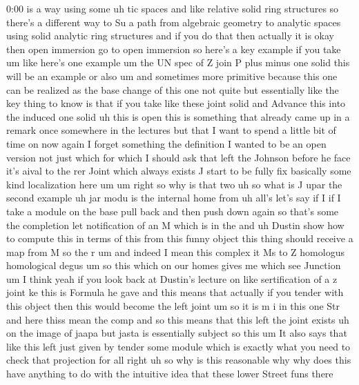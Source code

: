 \begin{unfinished}{0:00}
is  a  way  using  some  uh  tic
spaces  and  like  relative  solid  ring
structures  so  there's  a  different  way  to
Su  a  path  from  algebraic  geometry  to
analytic  spaces  using  solid  analytic
ring  structures  and  if  you  do  that  then
actually  it  is  okay  then  open  immersion
go  to  open  immersion  so  here's  a  key
example  if  you
take
um  like  here's  one  example  um
the  UN
spec  of  Z  join  P  plus  minus  one
solid  this  will  be  an
example  or
also
um  and  sometimes  more  primitive  because
this  one  can  be  realized  as  the  base
change  of  this  one  not  quite  but
essentially  like  the  key  thing  to  know
is  that  if  you  take  like  these  joint
solid  and  Advance
this  into  the  induced
one  solid  uh  this  is
open  this  is  something  that
already  came  up  in  a  remark  once
somewhere  in  the  lectures  but  that  I
want  to  spend  a  little  bit  of  time  on
now
again
I  forget  something  the  definition  I
wanted  to  be  an  open  version  not
just  which  for  which  I  should  ask
that  left  the  Johnson  before  he
face
it's  aival  to  the  rer  Joint  which  always
exists  J  start  to  be  fully  fix  basically
some  kind  localization  here
um
um  right  so  why  is  that  two
uh  so  what  is  J  upar  the  second
example  uh  jar
modu  is  the  internal  home
from
uh  all's  let's
say  if  I  if  I  take  a  module  on  the  base
pull  back  and  then  push  down  again  so
that's  some  the  completion
let
notification  of  an  M  which  is  in
the
and  uh  Dustin  show  how  to  compute  this
in  terms  of  this  from  this  funny
object  this  thing  should  receive  a  map
from  M  so  the
r  um  and  indeed  I  mean  this  complex  it
Ms  to
Z
homologus  homological  degus
um  so
this  which  on  our  homes  gives
me  which  see
Junction
um  I  think  yeah  if  you  look  back  at
Dustin's  lecture  on  like  sertification
of  a  z  joint  ke  this  is  Formula  he
gave  and  this  means  that  actually  if  you
tender  with  this  object  then  this  would
become  the  left
joint
um  so  it  is
m  i
in  this  one
Str  and  here  thiss  mean  the
comp  and  so  this  means  that  this  left
the  joint
exists  uh  on  the  image  of  jaapa  but
jasta  is  essentially  subject  so  this
um  It  also  says  that  like  this  left  just
given  by  tender  some  module  which  is
exactly  what  you  need  to  check  that
projection
for  all  right  uh  so  why  is  this
reasonable  why  why  does  this  have
anything  to  do  with  the  intuitive
idea  that  these  lower  Street  funs  there

\end{unfinished}
